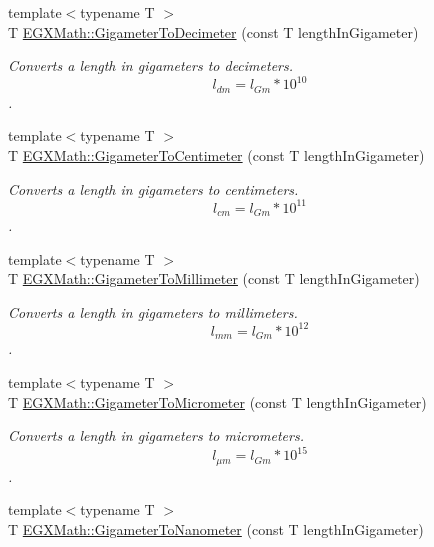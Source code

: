 \begin{DoxyCompactItemize}
{\footnotesize template$<$typename T $>$ }\\T \mbox{\hyperlink{group___e_g_x_math-_conversions-_length_conversions-_s_i-_gigameter-_s_i_ga9333dddd3642cf160b026516dd760576}{E\+G\+X\+Math\+::\+Gigameter\+To\+Decimeter}} (const T length\+In\+Gigameter)
\begin{DoxyCompactList}\small\item\em Converts a length in gigameters to decimeters. \[ l_{dm}=l_{Gm} * 10^{10} \]. \end{DoxyCompactList}\item 
{\footnotesize template$<$typename T $>$ }\\T \mbox{\hyperlink{group___e_g_x_math-_conversions-_length_conversions-_s_i-_gigameter-_s_i_gac0fc033ff4b887e157a333cde344b824}{E\+G\+X\+Math\+::\+Gigameter\+To\+Centimeter}} (const T length\+In\+Gigameter)
\begin{DoxyCompactList}\small\item\em Converts a length in gigameters to centimeters. \[ l_{cm}=l_{Gm} * 10^{11} \]. \end{DoxyCompactList}\item 
{\footnotesize template$<$typename T $>$ }\\T \mbox{\hyperlink{group___e_g_x_math-_conversions-_length_conversions-_s_i-_gigameter-_s_i_ga91b617f8bf6330f1379d3372e4968254}{E\+G\+X\+Math\+::\+Gigameter\+To\+Millimeter}} (const T length\+In\+Gigameter)
\begin{DoxyCompactList}\small\item\em Converts a length in gigameters to millimeters. \[ l_{mm}=l_{Gm} * 10^{12} \]. \end{DoxyCompactList}\item 
{\footnotesize template$<$typename T $>$ }\\T \mbox{\hyperlink{group___e_g_x_math-_conversions-_length_conversions-_s_i-_gigameter-_s_i_ga02f73d15581b1cd69a79b843186211f5}{E\+G\+X\+Math\+::\+Gigameter\+To\+Micrometer}} (const T length\+In\+Gigameter)
\begin{DoxyCompactList}\small\item\em Converts a length in gigameters to micrometers. \[ l_{\mu m}=l_{Gm} * 10^{15} \]. \end{DoxyCompactList}\item 
{\footnotesize template$<$typename T $>$ }\\T \mbox{\hyperlink{group___e_g_x_math-_conversions-_length_conversions-_s_i-_gigameter-_s_i_ga6538a7007f104833aa7ad690156342b5}{E\+G\+X\+Math\+::\+Gigameter\+To\+Nanometer}} (const T length\+In\+Gigameter)

\end{DoxyCompactItemize}
